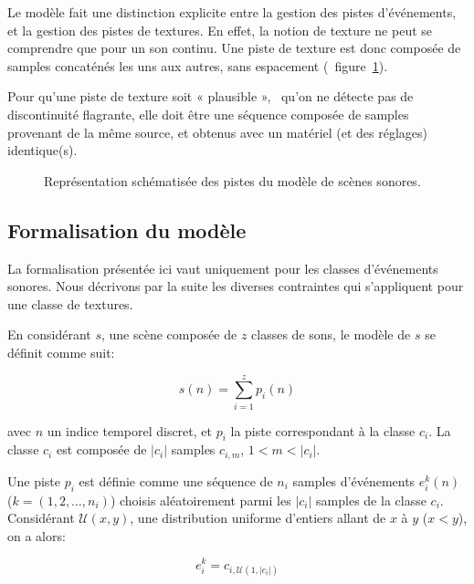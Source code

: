 Le modèle fait une distinction explicite entre la gestion des pistes d'événements, et la gestion des pistes de textures. En effet, la notion de texture ne peut se comprendre que pour un son continu. Une piste de texture est donc composée de samples concaténés les uns aux autres, sans espacement (\cf~figure~\ref{fig:modelSequence}). 

Pour qu'une piste de texture soit « plausible », \ie~qu'on ne détecte pas de discontinuité flagrante, elle doit être une séquence composée de samples provenant de la même source, et obtenus avec un matériel (et des réglages) identique(s).

\begin{figure}[t]
        \graphicspath{{gfx/ch_4/}}
        \myfloatalign
        \def\svgwidth{\linewidth}
        
       \caption{Représentation schématisée des pistes du modèle de scènes sonores.}\label{fig:modelSequence}
\end{figure}


\subsection{Formalisation du modèle}
 \label{sec:ch4_modelForm}
 
La formalisation présentée ici vaut uniquement pour les classes d'événements sonores. Nous décrivons par la suite les diverses contraintes qui s'appliquent pour une classe de textures.
 
En considérant $s$, une scène composée de $z$ classes de sons, le modèle de $s$ se définit comme suit:
 
 \begin{equation}
 s(n)=\sum_{i=1}^{z}p_i(n)
 \end{equation}

avec $n$ un indice temporel discret, et $p_i$ la piste correspondant à la classe $c_i$. La classe $c_i$ est composée de $\vert c_i\vert$ samples $c_{i,m}$, $1<m<\vert c_i\vert$. 

Une piste $p_i$ est définie comme une séquence de $n_i$ samples d'événements $e^k_i(n)$ ($k=(1,2,\ldots,n_i)$) choisis aléatoirement parmi les $\vert c_i\vert$ samples de la classe $c_i$. Considérant $\mathcal{U}(x,y)$, une distribution uniforme d'entiers allant de $x$ à $y$ ($x<y$), on a alors:

 \begin{equation}
 e^k_i=c_{i,\mathcal{U}(1,\vert c_i \vert)}
 \end{equation}

